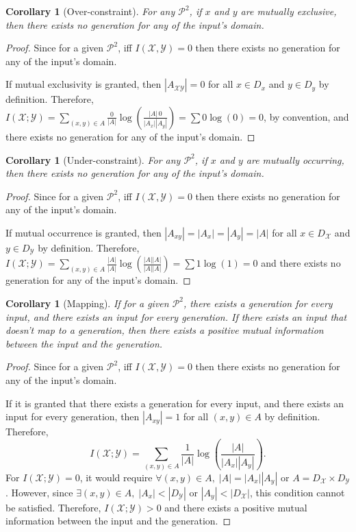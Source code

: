 \documentclass[stu,12pt]{apa7}
\newtheorem{corollary}[theorem]{Corollary}
\theoremstyle{definition}
\begin{document}
\begin{corollary}[Over-constraint]\label{col:over}
For any $\mathcal{P}^2$, if $x$ and $y$ are mutually exclusive, then there exists no generation for any of the input's domain.
\end{corollary}
\begin{proof}
    Since for a given $\mathcal{P}^2$, iff $I(\mathcal{X},\mathcal{Y}) = 0$ then there exists no generation for any of the input's domain.

    If mutual exclusivity is granted, then $|A_{\mathcal{XY}}| = 0$ for all $x \in D_x$ and $y \in D_y$ by definition. Therefore, $I(\mathcal{X};\mathcal{Y})
=\sum_{(x,y)\in A}
\frac{0}{|A|}
\log\!\left(\frac{|A|\,0}{|A_x||A_y|}\right) = \sum 0 \log(0) = 0$, by convention, and there exists no generation for any of the input's domain.
\end{proof}

\begin{corollary}[Under-constraint]\label{col:under}
For any $\mathcal{P}^2$, if $x$ and $y$ are mutually occurring, then there exists no generation for any of the input's domain.
\end{corollary}
\begin{proof}
    Since for a given $\mathcal{P}^2$, iff $I(\mathcal{X},\mathcal{Y}) = 0$ then there exists no generation for any of the input's domain.

    If mutual occurrence is granted, then $|A_{xy}| = |A_x| = |A_y| = |A|$ for all $x \in D_\mathcal{X}$ and $y \in D_\mathcal{Y}$ by definition. Therefore, $I(\mathcal{X};\mathcal{Y})
=\sum_{(x,y)\in A}
\frac{|A|}{|A|}
\log\!\left(\frac{|A||A|}{|A||A|}\right) = \sum 1 \log(1) = 0$ and there exists no generation for any of the input's domain.
\end{proof}
\begin{corollary}[Mapping]\label{col:map}
    If for a given $\mathcal{P}^2$, there exists a generation for every input, and there exists an input for every generation. If there exists an input that doesn't map to a generation, then there exists a positive mutual information between the input and the generation.
\end{corollary}
\begin{proof}
    Since for a given $\mathcal{P}^2$, iff $I(\mathcal{X},\mathcal{Y}) = 0$ then there exists no generation for any of the input's domain.

    If it is granted that there exists a generation for every input, and there exists an input for every generation, then $|A_{xy}| = 1$ for all $(x,y) \in A$ by definition. Therefore, \[I(\mathcal{X};\mathcal{Y}) = \sum_{(x,y) \in A} \frac{1}{|A|} \log\!\left(\frac{|A|}{|A_x||A_y|}\right).\] For $I(\mathcal{X};\mathcal{Y}) = 0$, it would require $\forall (x,y) \in A,\; |A| = |A_x||A_y|$ or $A = D_\mathcal{X} \times D_\mathcal{Y}$. However, since $\exists (x,y) \in A,\; |A_x| < |D_\mathcal{Y}|$ or $|A_y| < |D_\mathcal{X}|$, this condition cannot be satisfied. Therefore, $I(\mathcal{X};\mathcal{Y}) > 0$ and there exists a positive mutual information between the input and the generation.
\end{proof}
\end{document}
